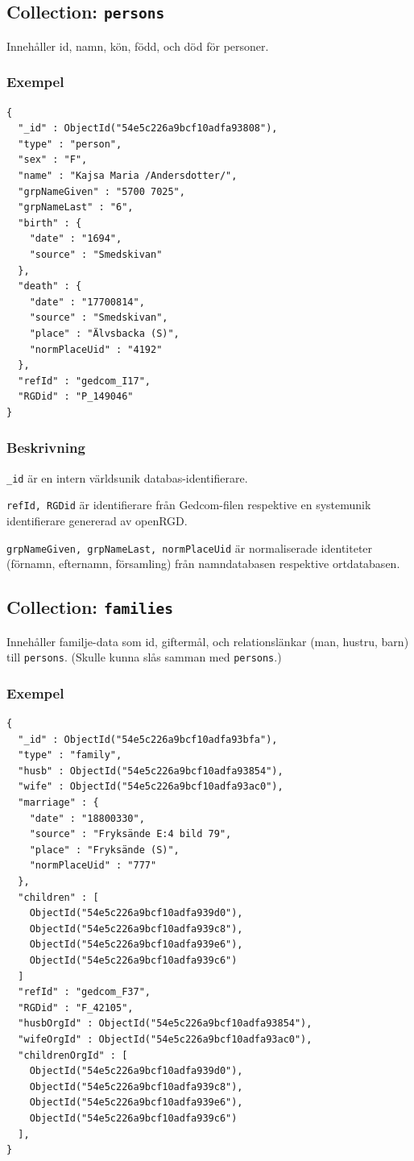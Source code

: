 \documentclass[swedish,11pt]{article}
\begin{document}
\subsection{Collection: \tt persons}
Innehåller id, namn, kön, född, och död för personer.
\subsubsection{Exempel}
\begin{verbatim}
{
  "_id" : ObjectId("54e5c226a9bcf10adfa93808"),
  "type" : "person",
  "sex" : "F",
  "name" : "Kajsa Maria /Andersdotter/",
  "grpNameGiven" : "5700 7025",
  "grpNameLast" : "6",
  "birth" : {
    "date" : "1694",
    "source" : "Smedskivan"
  },
  "death" : {
    "date" : "17700814",
    "source" : "Smedskivan",
    "place" : "Älvsbacka (S)",
    "normPlaceUid" : "4192"
  },
  "refId" : "gedcom_I17",
  "RGDid" : "P_149046"
}
\end{verbatim}
\subsubsection{Beskrivning}
\verb+_id+ är en intern världsunik databas-identifierare.

\verb+refId, RGDid+ är identifierare från Gedcom-filen respektive en
systemunik identifierare genererad av openRGD.

\verb+grpNameGiven, grpNameLast, normPlaceUid+ är normaliserade
identiteter (förnamn, efternamn, församling)
från namndatabasen respektive ortdatabasen.

\subsection{Collection: \tt families}
Innehåller familje-data som id, giftermål, och relationslänkar (man, hustru, barn) till
\verb+persons+. (Skulle kunna slås samman med \verb+persons+.)

\subsubsection{Exempel}
\begin{verbatim}
{
  "_id" : ObjectId("54e5c226a9bcf10adfa93bfa"),
  "type" : "family",
  "husb" : ObjectId("54e5c226a9bcf10adfa93854"),
  "wife" : ObjectId("54e5c226a9bcf10adfa93ac0"),
  "marriage" : {
    "date" : "18800330",
    "source" : "Fryksände E:4 bild 79",
    "place" : "Fryksände (S)",
    "normPlaceUid" : "777"
  },
  "children" : [
    ObjectId("54e5c226a9bcf10adfa939d0"),
    ObjectId("54e5c226a9bcf10adfa939c8"),
    ObjectId("54e5c226a9bcf10adfa939e6"),
    ObjectId("54e5c226a9bcf10adfa939c6")
  ]
  "refId" : "gedcom_F37",
  "RGDid" : "F_42105",
  "husbOrgId" : ObjectId("54e5c226a9bcf10adfa93854"),
  "wifeOrgId" : ObjectId("54e5c226a9bcf10adfa93ac0"),
  "childrenOrgId" : [
    ObjectId("54e5c226a9bcf10adfa939d0"),
    ObjectId("54e5c226a9bcf10adfa939c8"),
    ObjectId("54e5c226a9bcf10adfa939e6"),
    ObjectId("54e5c226a9bcf10adfa939c6")
  ],
}
\end{verbatim}
\end{document}
